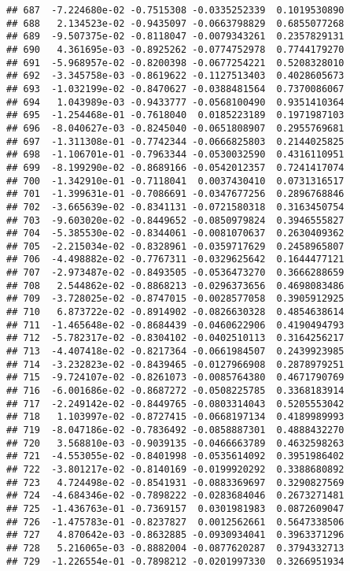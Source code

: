 \documentclass[
]{article}
\begin{document}
\begin{verbatim}
## 687  -7.224680e-02 -0.7515308 -0.0335252339  0.1019530890
## 688   2.134523e-02 -0.9435097 -0.0663798829  0.6855077268
## 689  -9.507375e-02 -0.8118047 -0.0079343261  0.2357829131
## 690   4.361695e-03 -0.8925262 -0.0774752978  0.7744179270
## 691  -5.968957e-02 -0.8200398 -0.0677254221  0.5208328010
## 692  -3.345758e-03 -0.8619622 -0.1127513403  0.4028605673
## 693  -1.032199e-02 -0.8470627 -0.0388481564  0.7370086067
## 694   1.043989e-03 -0.9433777 -0.0568100490  0.9351410364
## 695  -1.254468e-01 -0.7618040  0.0185223189  0.1971987103
## 696  -8.040627e-03 -0.8245040 -0.0651808907  0.2955769681
## 697  -1.311308e-01 -0.7742344 -0.0666825803  0.2144025825
## 698  -1.106701e-01 -0.7963344 -0.0530032590  0.4316110951
## 699  -8.199290e-02 -0.8689166 -0.0542012357  0.7241417074
## 700  -1.342910e-01 -0.7118041  0.0037430410  0.0731316517
## 701  -1.399631e-01 -0.7086691 -0.0347677256  0.2896768846
## 702  -3.665639e-02 -0.8341131 -0.0721580318  0.3163450754
## 703  -9.603020e-02 -0.8449652 -0.0850979824  0.3946555827
## 704  -5.385530e-02 -0.8344061 -0.0081070637  0.2630409362
## 705  -2.215034e-02 -0.8328961 -0.0359717629  0.2458965807
## 706  -4.498882e-02 -0.7767311 -0.0329625642  0.1644477121
## 707  -2.973487e-02 -0.8493505 -0.0536473270  0.3666288659
## 708   2.544862e-02 -0.8868213 -0.0296373656  0.4698083486
## 709  -3.728025e-02 -0.8747015 -0.0028577058  0.3905912925
## 710   6.873722e-02 -0.8914902 -0.0826630328  0.4854638614
## 711  -1.465648e-02 -0.8684439 -0.0460622906  0.4190494793
## 712  -5.782317e-02 -0.8304102 -0.0402510113  0.3164256217
## 713  -4.407418e-02 -0.8217364 -0.0661984507  0.2439923985
## 714  -3.232823e-02 -0.8439465 -0.0127966908  0.2878979251
## 715  -9.724107e-02 -0.8261073 -0.0085764380  0.4671790769
## 716  -6.001686e-02 -0.8687272 -0.0508225785  0.3368183914
## 717  -2.249142e-02 -0.8449765 -0.0803314043  0.5205553042
## 718   1.103997e-02 -0.8727415 -0.0668197134  0.4189989993
## 719  -8.047186e-02 -0.7836492 -0.0858887301  0.4888432270
## 720   3.568810e-03 -0.9039135 -0.0466663789  0.4632598263
## 721  -4.553055e-02 -0.8401998 -0.0535614092  0.3951986402
## 722  -3.801217e-02 -0.8140169 -0.0199920292  0.3388680892
## 723   4.724498e-02 -0.8541931 -0.0883369697  0.3290827569
## 724  -4.684346e-02 -0.7898222 -0.0283684046  0.2673271481
## 725  -1.436763e-01 -0.7369157  0.0301981983  0.0872609047
## 726  -1.475783e-01 -0.8237827  0.0012562661  0.5647338506
## 727   4.870642e-03 -0.8632885 -0.0930934041  0.3963371296
## 728   5.216065e-03 -0.8882004 -0.0877620287  0.3794332713
## 729  -1.226554e-01 -0.7898212 -0.0201997330  0.3266951934

\end{verbatim}
\end{document}
